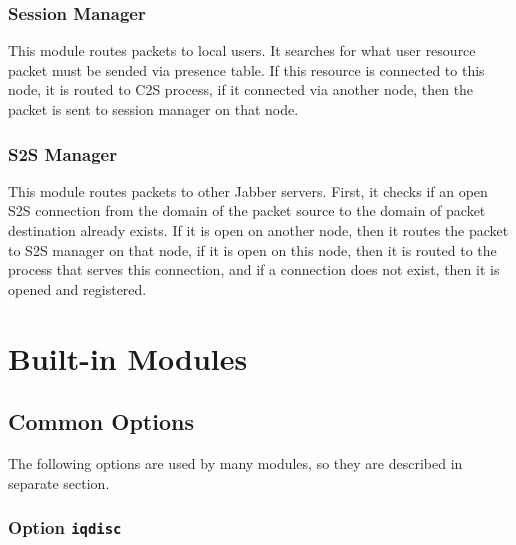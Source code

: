 \documentclass[10pt]{article}
\newcommand{\Jabber}{Jabber}
\begin{document}
\subsubsection{Session Manager}

This module routes packets to local users.  It searches for what user resource
packet must be sended via presence table.  If this resource is connected to
this node, it is routed to C2S process, if it connected via another node, then
the packet is sent to session manager on that node.


\subsubsection{S2S Manager}

This module routes packets to other \Jabber{} servers.  First, it checks if an
open S2S connection from the domain of the packet source to the domain of
packet destination already exists. If it is open on another node, then it
routes the packet to S2S manager on that node, if it is open on this node, then
it is routed to the process that serves this connection, and if a connection
does not exist, then it is opened and registered.



\appendix{}

\section{Built-in Modules}
\label{sec:modules}

\subsection{Common Options}
\label{sec:modcommonopts}

The following options are used by many modules, so they are described in
separate section.

\subsubsection{Option \texttt{iqdisc}}
\end{document}
